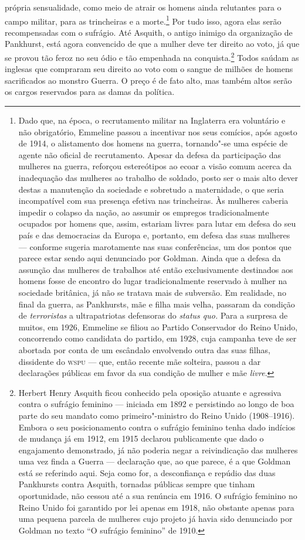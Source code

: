 própria sensualidade, como meio de atrair os homens ainda relutantes
para o campo militar, para as trincheiras e a morte.\footnote{Dado que,
  na época, o recrutamento militar na Inglaterra era voluntário e não
  obrigatório, Emmeline passou a incentivar nos seus comícios, após
  agosto de 1914, o alistamento dos homens na guerra, tornando"-se uma
  espécie de agente não oficial de recrutamento. Apesar da defesa da
  participação das mulheres na guerra, reforçou estereótipos ao ecoar a
  visão comum acerca da inadequação das mulheres ao trabalho de soldado,
  posto ser o mais alto dever destas a manutenção da
  sociedade e sobretudo a maternidade, o que seria incompatível com sua
  presença efetiva nas trincheiras. Às mulheres caberia impedir o
  colapso da nação, ao assumir os empregos tradicionalmente ocupados por
  homens que, assim, estariam livres para lutar em defesa do seu país e
  das democracias da Europa e, portanto, em defesa das suas mulheres --- conforme sugeria marotamente nas suas conferências, um dos pontos que
  parece estar sendo aqui denunciado por Goldman. Ainda que a defesa da
  assunção das mulheres de trabalhos até então exclusivamente destinados
  aos homens fosse de encontro do lugar tradicionalmente reservado à
  mulher na sociedade britânica, já não se tratava mais de subversão. Em
  realidade, no final da guerra, as Pankhursts, mãe e filha mais velha,
  passaram da condição de \textit{terroristas} a ultrapatriotas defensoras do
  \textit{status quo.} Para a surpresa de muitos, em 1926, Emmeline
  se filiou ao Partido Conservador do Reino Unido, concorrendo como
  candidata do partido, em 1928, cuja campanha teve de ser abortada por
  conta de um escândalo envolvendo outra das suas filhas, dissidente do
  \textsc{wspu} --- que, então recente mãe solteira, passou a dar declarações
  públicas em favor da sua condição de mulher e mãe \textit{livre}.} Por tudo
isso, agora elas serão recompensadas ​​com o sufrágio. Até Asquith, o
antigo inimigo da organização de Pankhurst, está agora convencido de que
a mulher deve ter direito ao voto, já que se provou tão feroz no seu
ódio e tão empenhada na conquista.\footnote{Herbert Henry Asquith ficou
  conhecido pela oposição atuante e agressiva contra o sufrágio feminino
  --- iniciada em 1892 e persistindo ao longo de boa parte do seu mandato
  como primeiro"-ministro do Reino Unido (1908--1916). Embora o seu
  posicionamento contra o sufrágio feminino tenha dado indícios de
  mudança já em 1912, em 1915 declarou publicamente que dado o
  engajamento demonstrado, já não poderia negar a reivindicação das
  mulheres uma vez finda a Guerra --- declaração que, ao que parece, é a
  que Goldman está se referindo aqui. Seja como for, a desconfiança e
  repúdio das duas Pankhursts contra Asquith, tornadas públicas sempre
  que tinham oportunidade, não cessou até a sua renúncia em 1916. O
  sufrágio feminino no Reino Unido foi garantido por lei apenas em 1918,
  não obstante apenas para uma pequena parcela de mulheres cujo projeto
  já havia sido denunciado por Goldman no texto ``O sufrágio feminino''
  de 1910.} Todos saúdam as inglesas que compraram seu direito ao voto
com o sangue de milhões de homens sacrificados ao monstro Guerra. O
preço é de fato alto, mas também altos serão os cargos reservados para
as damas da política.

